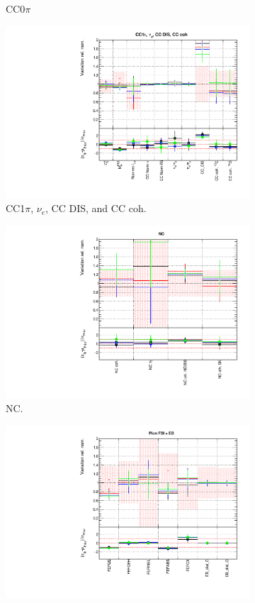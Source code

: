 \begin{figure}
\begin{subfigure}{0.49\textwidth}
  \caption{CC0$\pi$}
\end{subfigure}
\begin{subfigure}{0.49\textwidth}
  \centering
  \includegraphics[width=0.95\linewidth]{figs/detcovbinxsec_2}
  \caption{CC1$\pi$, $\nu_e$, CC DIS, and CC coh.}
\end{subfigure}
\begin{subfigure}{0.49\textwidth}
  \centering
  \includegraphics[width=0.95\linewidth]{figs/detcovbinxsec_3}
  \caption{NC.}
\end{subfigure}
\begin{subfigure}{0.49\textwidth}
  \centering
  \includegraphics[width=0.95\linewidth]{figs/detcovbinxsec_4}

\end{subfigure}
\end{figure}
